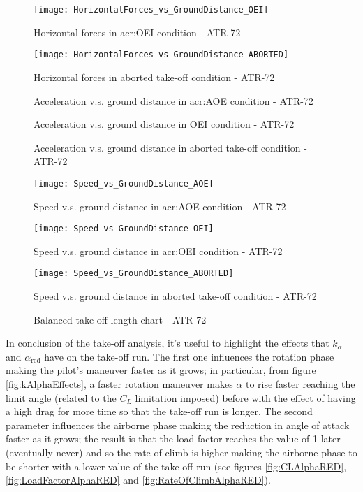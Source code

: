 %
\begin{figure}[H]
\centering
\texttt{[image: HorizontalForces\_vs\_GroundDistance\_OEI]}
\caption{Horizontal forces in \gls{acr:OEI} condition - ATR-72}
\end{figure}
%
\begin{figure}[H]
\centering
\texttt{[image: HorizontalForces\_vs\_GroundDistance\_ABORTED]}
\caption{Horizontal forces in aborted take-off condition - ATR-72}
\end{figure}
%
\begin{figure}[H]
\centering

\caption{Acceleration v.s. ground distance in \gls{acr:AOE} condition - ATR-72}
\end{figure}
%
\begin{figure}[H]
\centering

\caption{Acceleration v.s. ground distance in OEI condition - ATR-72}
\end{figure}
%
\begin{figure}[H]
\centering

\caption{Acceleration v.s. ground distance in aborted take-off condition - ATR-72}
\end{figure}
%
\begin{figure}[H]
\centering
\texttt{[image: Speed\_vs\_GroundDistance\_AOE]}
\caption{Speed v.s. ground distance in \gls{acr:AOE} condition - ATR-72}
\end{figure}
%
\begin{figure}[H]
\centering
\texttt{[image: Speed\_vs\_GroundDistance\_OEI]}
\caption{Speed v.s. ground distance in \gls{acr:OEI} condition - ATR-72}
\end{figure}
%
\begin{figure}[H]
\centering
\texttt{[image: Speed\_vs\_GroundDistance\_ABORTED]}
\caption{Speed v.s. ground distance in aborted take-off condition - ATR-72}
\end{figure}
%
\begin{figure}[H]
\centering

\caption{Balanced take-off length chart - ATR-72}
\end{figure}
%
\noindent
In conclusion of the take-off analysis, it's useful to highlight the effects that $k_{\alpha}$ and $\alpha_{\text{red}}$ have on the take-off run. The first one influences the rotation phase making the pilot's maneuver faster as it grows; in particular, from figure \ref{fig:kAlphaEffects}, a faster rotation maneuver makes $\alpha$ to rise faster reaching the limit angle (related to the $C_L$ limitation imposed) before with the effect of having a high drag for more time so that the take-off run is longer. The second parameter influences the airborne phase making the reduction in angle of attack faster as it grows; the result is that the load factor reaches the value of 1 later (eventually never) and so the rate of climb is higher making the airborne phase to be shorter with a lower value of the take-off run (see figures \ref{fig:CLAlphaRED}, \ref{fig:LoadFactorAlphaRED} and \ref{fig:RateOfClimbAlphaRED}).
